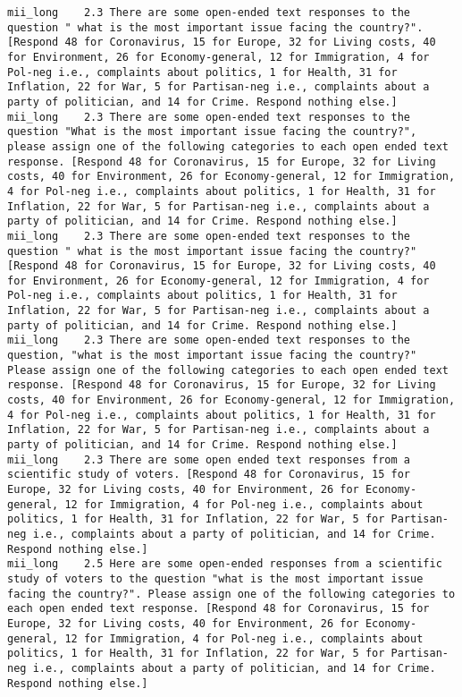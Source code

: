 \begin{lstlisting}[label=lst:promptvariants]
mii_long	2.3	There are some open-ended text responses to the question " what is the most important issue facing the country?". [Respond 48 for Coronavirus, 15 for Europe, 32 for Living costs, 40 for Environment, 26 for Economy-general, 12 for Immigration, 4 for Pol-neg i.e., complaints about politics, 1 for Health, 31 for Inflation, 22 for War, 5 for Partisan-neg i.e., complaints about a party of politician, and 14 for Crime. Respond nothing else.]
mii_long	2.3	There are some open-ended text responses to the question "What is the most important issue facing the country?", please assign one of the following categories to each open ended text response. [Respond 48 for Coronavirus, 15 for Europe, 32 for Living costs, 40 for Environment, 26 for Economy-general, 12 for Immigration, 4 for Pol-neg i.e., complaints about politics, 1 for Health, 31 for Inflation, 22 for War, 5 for Partisan-neg i.e., complaints about a party of politician, and 14 for Crime. Respond nothing else.]
mii_long	2.3	There are some open-ended text responses to the question " what is the most important issue facing the country?" [Respond 48 for Coronavirus, 15 for Europe, 32 for Living costs, 40 for Environment, 26 for Economy-general, 12 for Immigration, 4 for Pol-neg i.e., complaints about politics, 1 for Health, 31 for Inflation, 22 for War, 5 for Partisan-neg i.e., complaints about a party of politician, and 14 for Crime. Respond nothing else.]
mii_long	2.3	There are some open-ended text responses to the question, "what is the most important issue facing the country?" Please assign one of the following categories to each open ended text response. [Respond 48 for Coronavirus, 15 for Europe, 32 for Living costs, 40 for Environment, 26 for Economy-general, 12 for Immigration, 4 for Pol-neg i.e., complaints about politics, 1 for Health, 31 for Inflation, 22 for War, 5 for Partisan-neg i.e., complaints about a party of politician, and 14 for Crime. Respond nothing else.]
mii_long	2.3	There are some open ended text responses from a scientific study of voters. [Respond 48 for Coronavirus, 15 for Europe, 32 for Living costs, 40 for Environment, 26 for Economy-general, 12 for Immigration, 4 for Pol-neg i.e., complaints about politics, 1 for Health, 31 for Inflation, 22 for War, 5 for Partisan-neg i.e., complaints about a party of politician, and 14 for Crime. Respond nothing else.]
mii_long	2.5	Here are some open-ended responses from a scientific study of voters to the question "what is the most important issue facing the country?". Please assign one of the following categories to each open ended text response. [Respond 48 for Coronavirus, 15 for Europe, 32 for Living costs, 40 for Environment, 26 for Economy-general, 12 for Immigration, 4 for Pol-neg i.e., complaints about politics, 1 for Health, 31 for Inflation, 22 for War, 5 for Partisan-neg i.e., complaints about a party of politician, and 14 for Crime. Respond nothing else.]

\end{lstlisting}
